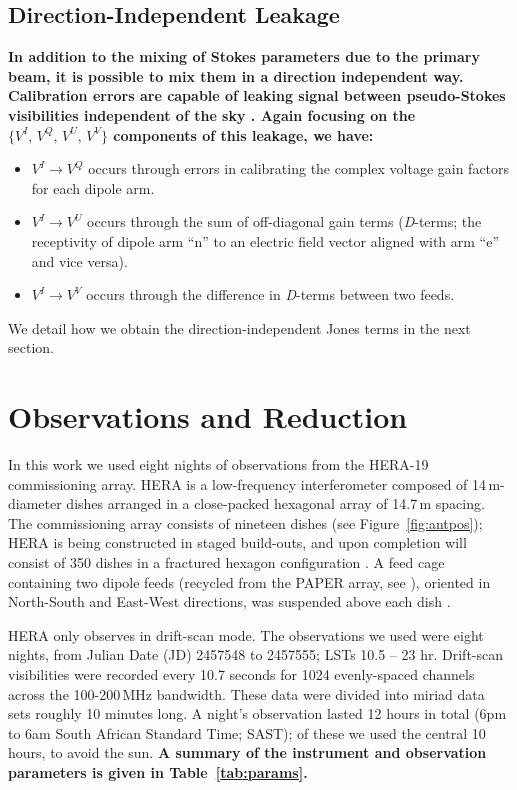 \documentclass[twocolumn, trackchanges]{aastex61}
\newcommand{\edited}[1]{{\bf \color{blue} #1}}
\begin{document}
\subsection{Direction-Independent Leakage}
\label{subsec:DI-Leak}

\edited{
In addition to the mixing of Stokes parameters due to the primary beam, it is possible to mix them in a direction independent way. Calibration errors are capable of leaking signal between pseudo-Stokes visibilities independent of the sky \citep{TMS}. Again focusing on the $\{V^I,\,V^Q,\,V^U,\,V^V\}$ components of this leakage, we have:
\begin{itemize}
\item $V^I \rightarrow V^Q$ occurs through errors in calibrating the complex voltage gain factors for each dipole arm.
\item $V^I \rightarrow V^U$ occurs through the sum of off-diagonal gain terms (\textit{D}-terms; the receptivity of dipole arm ``n'' to an electric field vector aligned with arm ``e'' and vice versa).
\item $V^I \rightarrow V^V$ occurs through the difference in \textit{D}-terms between two feeds.
\end{itemize}

We detail how we obtain the direction-independent Jones terms in the next section.
}

\section{Observations and Reduction}
\label{sec:obs}

In this work we used eight nights of observations from the HERA-19 commissioning array. HERA is a low-frequency interferometer composed of 14\,m-diameter dishes arranged in a close-packed hexagonal array of 14.7\,m spacing. The commissioning array consists of nineteen dishes (see Figure~\ref{fig:antpos}); HERA is being constructed in staged build-outs, and upon completion will consist of 350 dishes in a fractured hexagon configuration \citep[see][]{DillonParsons16, deBoer17}. A feed cage containing two dipole feeds (recycled from the PAPER array, see \citealt{Parsons.10}), oriented in North-South and East-West directions, was suspended above each dish \citep{Neben.16,Ewall-Wice.16,Thyagarajan.16}.

HERA only observes in drift-scan mode. The observations we used were eight nights, from Julian Date (JD) 2457548 to 2457555; LSTs 10.5 -- 23 hr. Drift-scan visibilities were recorded every 10.7 seconds for 1024 evenly-spaced channels across the 100-200\,MHz bandwidth. These data were divided into {\sc miriad} data sets roughly 10 minutes long. A night's observation lasted 12 hours in total (6pm to 6am South African Standard Time; SAST); of these we used the central 10 hours, to avoid the sun. \edited{A summary of the instrument and observation parameters is given in Table~\ref{tab:params}.}
\end{document}
